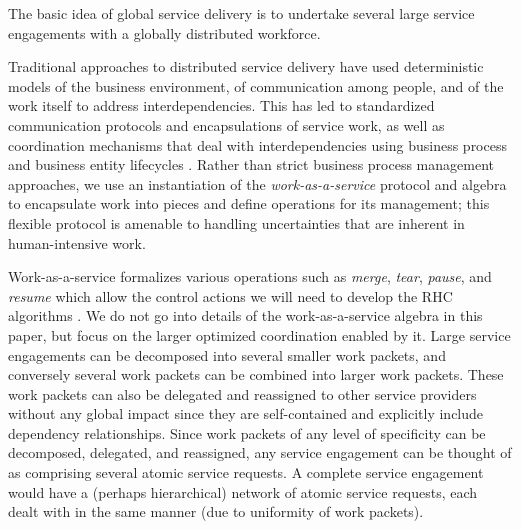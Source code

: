 \documentclass[10pt,journal,cspaper,compsoc]{IEEEtran}
\begin{document}
The basic idea of global service delivery is to undertake several large service engagements with a globally
distributed workforce.  

Traditional approaches to distributed service delivery have used deterministic models of the business environment, 
of communication among people, and of the work itself to address interdependencies. This has led to standardized 
communication protocols and encapsulations of service work, as well as coordination mechanisms that deal with interdependencies 
using business process and business entity lifecycles \cite{DesaiCS2009, OppenheimBRC2011, LeymannR2000, NigamC2003}.
Rather than strict business process management approaches, we use an instantiation of the \emph{work-as-a-service} protocol and algebra 
\cite{OppenheimVC2011,OppenheimVC2014} to encapsulate work into pieces and define operations for its management; 
this flexible protocol is amenable to handling uncertainties that are inherent in human-intensive work.  

Work-as-a-service formalizes various operations such as \emph{merge}, \emph{tear}, 
\emph{pause}, and \emph{resume} which allow the control actions we will need to develop the RHC algorithms 
\cite{OppenheimVC2011,OppenheimVC2014,VaculinCOV2012}. We do not go into details of the work-as-a-service 
algebra in this paper, but focus on the larger optimized coordination enabled by it.
Large service engagements can be decomposed into several smaller work packets, 
and conversely several work packets can be combined into larger work packets. These work packets can also be 
delegated and reassigned to other service providers without any global impact since they are self-contained 
and explicitly include dependency relationships. Since work packets of any level of specificity can be decomposed, 
delegated, and reassigned, any service 
engagement can be thought of as comprising several atomic service requests. 
A complete service engagement would have a (perhaps hierarchical) network of atomic service requests, each 
dealt with in the same manner (due to uniformity of work packets).
\end{document}
